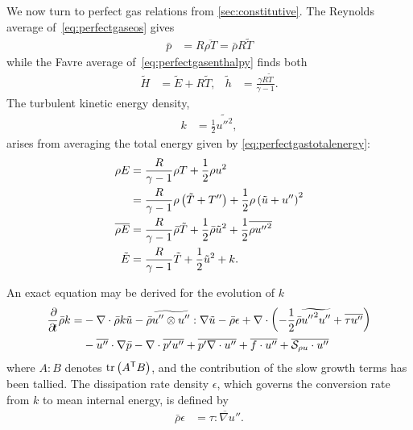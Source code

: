 We now turn to perfect gas relations from \autoref{sec:constitutive}.
The Reynolds average of~\eqref{eq:perfectgaseos} gives
\begin{align}
  \bar{p} &= R\overline{\rho{}T} = \bar{\rho}R\tilde{T}
\end{align}
while the Favre average of~\eqref{eq:perfectgasenthalpy} finds both
\begin{align}
 \tilde{H} &= \tilde{E} + R \tilde{T},
&
 \tilde{h} &= \frac{\gamma{}R\tilde{T}}{\gamma-1}.
\end{align}
The turbulent kinetic energy density,
\begin{align}
  k &= \frac{1}{2}\widetilde{{u''}^2},
 \end{align}
arises from averaging the total energy given by
\eqref{eq:perfectgastotalenergy}:
\begin{align}
  \rho{} E
&=
  \frac{R}{\gamma-1} \rho{}T + \frac{1}{2}\rho{} u^{2}
\notag\\
&=
  \frac{R}{\gamma-1} \rho{}\left( \tilde{T} + T'' \right)
+ \frac{1}{2}\rho{} \left( \tilde{u} + u'' \right)^2
\\
  \overline{\rho{}E}
&=
  \frac{R}{\gamma-1} \bar{\rho} \tilde{T}
+ \frac{1}{2}\bar{\rho} \tilde{u}^2
+ \frac{1}{2}\overline{\rho{}{u''}^2}
\\
  \tilde{E}
&=
  \frac{R}{\gamma-1} \tilde{T}
+ \frac{1}{2} \tilde{u}^2
+ k.
\end{align}

An exact equation may be derived for the evolution of $k$
\citep[\textsection{}5]{OliverFANSModels2011}
\begin{align}
\label{eq:fanstke1}
    \frac{\partial\!}{\partial\!t}\bar{\rho}k
 =
 &- \nabla\cdot\bar{\rho}k\tilde{u}
  - \bar{\rho} \widetilde{u''\otimes{}u''} : \nabla\tilde{u}
  - \bar{\rho} \epsilon
  + \nabla\cdot\left(
        -\frac{1}{2}\bar{\rho}\widetilde{{u''}^{2}u''}
      + \overline{\tau{}u''}
    \right)
\notag\\
 &- \overline{u''}\cdot\nabla\bar{p}
  - \nabla\cdot\overline{p' u''}
  + \overline{p' \nabla\cdot{}u''}
  + \overline{f\cdot{}u''}
  + \overline{\mathcal{S}_{\rho{} u}\cdot{}u''}
\end{align}
where $A:B$ denotes $\operatorname{tr} \left({A}^{\mathsf{T}} B\right)$, and the contribution of
the slow growth terms has been tallied.  The dissipation rate
density $\epsilon$, which governs the conversion rate from $k$ to mean internal
energy, is defined by
\begin{align}
  \bar{\rho} \epsilon &= \overline{\tau : \nabla{}u''}.
\end{align}

